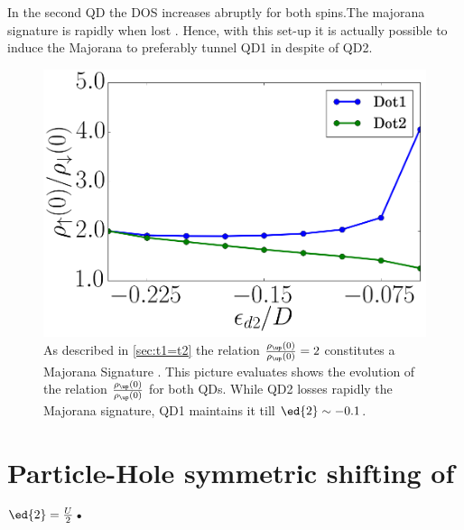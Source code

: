 In the second QD the DOS increases abruptly for both spins.The majorana signature is rapidly when  lost . Hence, with this set-up it is actually possible to induce the Majorana to preferably tunnel QD1 in despite of QD2.  \\
\begin{figure}[H]
\centering
\includegraphics[scale=0.3]{IMAGES/ed2/Fermi.png}
\caption{\label{fig:ed2/Fermi} As described in \ref{sec:t1=t2} the relation $\frac{\rho_\up(0)}{\rho_\up(0)}=2$ constitutes a Majorana Signature . This picture evaluates shows the evolution of the relation $\frac{\rho_\up(0)}{\rho_\up(0)}$ for both QDs. While QD2 losses rapidly the Majorana signature, QD1 maintains it till $\ed{2}\sim -0.1$.}
\end{figure}


\newpage



\section{Particle-Hole symmetric shifting of $\ed{2}=\frac{U}{2}$.}

